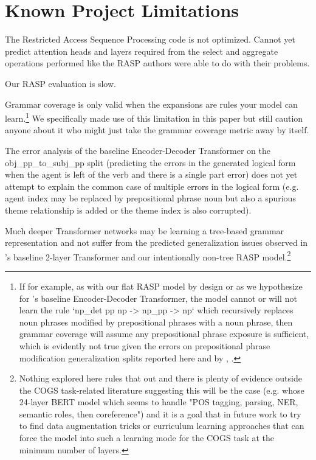 \documentclass[11pt]{article}
\begin{document}
\section*{Known Project Limitations}

The Restricted Access Sequence Processing code is not optimized. Cannot yet predict attention heads and layers required from the select and aggregate operations performed like the RASP authors \cite{Weiss2021} were able to do with their problems.

Our RASP evaluation is slow.

Grammar coverage \cite{fuzzingbook2023:GrammarCoverageFuzzer} is only valid when the expansions are rules your model can learn.\footnote{If for example, as with our flat RASP model by design or as we hypothesize for \cite{Wu2023}'s baseline Encoder-Decoder Transformer, the model cannot or will not learn the rule `np\_det pp np -> np\_pp -> np` which recursively replaces noun phrases modified by prepositional phrases with a noun phrase, then grammar coverage will assume any prepositional phrase exposure is sufficient, which is evidently not true given the errors on prepositional phrase modification generalization splits reported here and by \cite{Wu2023}, \cite{KimLinzen2020}.} We specifically made use of this limitation in this paper but still caution anyone about it who might just take the grammar coverage metric away by itself.

The error analysis of the \cite{Wu2023} baseline Encoder-Decoder Transformer on the obj\_pp\_to\_subj\_pp split (predicting the errors in the generated logical form when the agent is left of the verb and there is a single part error) does not yet attempt to explain the common case of multiple errors in the logical form (e.g. agent index may be replaced by prepositional phrase noun but also a spurious theme relationship is added or the theme index is also corrupted).

Much deeper Transformer networks may be learning a tree-based grammar representation and not suffer from the predicted generalization issues observed in \cite{Wu2023}'s baseline 2-layer Transformer and our intentionally non-tree RASP model.\footnote{Nothing explored here rules that out and there is plenty of evidence outside the COGS task-related literature suggesting this will be the case (e.g. \cite{tenney2019bertrediscoversclassicalnlp} whose 24-layer BERT model which seems to handle "POS tagging, parsing, NER, semantic roles, then coreference") and it is a goal that in future work to try to find data augmentation tricks or curriculum learning approaches that can force the model into such a learning mode for the COGS task at the minimum number of layers.}
\end{document}
